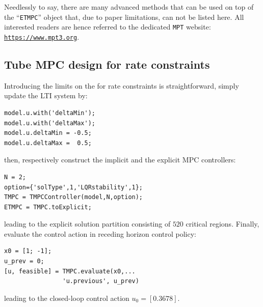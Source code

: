 \documentclass[letterpaper, 10 pt, conference]{ieeeconf}
\begin{document}
Needlessly to say, there are many advanced methods that can be used on top of the ``\verb|ETMPC|'' object that, due to paper limitations, can not be listed here. All interested readers are hence referred to the dedicated \texttt{MPT} website: \\ \texttt{\url{https://www.mpt3.org}}.


\subsection{Tube MPC design for rate constraints}
\label{sec:mptplus_tube_mpc_delta_u}

Introducing the limits on the for rate constraints is straightforward, simply update the LTI system by:
\begin{lstlisting}[style=Matlab-editor]
model.u.with('deltaMin');
model.u.with('deltaMax');
model.u.deltaMin = -0.5;
model.u.deltaMax =  0.5;
\end{lstlisting}
then, respectively construct the implicit and the explicit MPC controllers:
\begin{lstlisting}[style=Matlab-editor]
N = 2;
option={'solType',1,'LQRstability',1};
TMPC = TMPCController(model,N,option);
ETMPC = TMPC.toExplicit;
\end{lstlisting}
leading to the explicit solution partition consisting of $520$ critical regions. Finally, evaluate the control action in receding horizon control policy:
\begin{lstlisting}[style=Matlab-editor]
x0 = [1; -1];
u_prev = 0;
[u, feasible] = TMPC.evaluate(x0,...
                'u.previous', u_prev)
\end{lstlisting}
leading to the closed-loop control action $u_0 = [0.3678]$.

%
\end{document}
